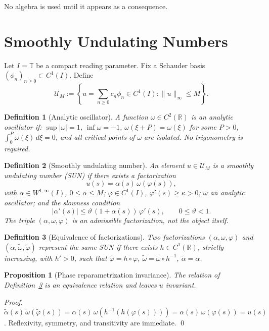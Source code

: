 \documentclass[11pt,a4paper]{article}
\newtheorem{definition}{Definition}
\newtheorem{proposition}{Proposition}
\newcommand{\R}{\mathbb{R}}
\newcommand{\T}{\mathbb{T}}
\newcommand{\UM}{\mathcal{U}_M}
\begin{document}
No algebra is used until it appears as a consequence.

\section{Smoothly Undulating Numbers}

Let $I = \T$ be a compact reading parameter. Fix a Schauder basis
$(\phi_n)_{n\ge0} \subset C^1(I)$. Define
\[
\UM := \left\{ u = \sum_{n\ge0} c_n \phi_n \in C^1(I) :
  \|u\|_\infty \le M \right\}.
\]

\begin{definition}[Analytic oscillator]
\label{def:oscillator}
A function $\omega \in C^2(\R)$ is an \emph{analytic oscillator} if:
$\sup|\omega| = 1$, $\inf\omega = -1$,
$\omega(\xi + P) = \omega(\xi)$ for some $P > 0$,
$\int_0^P \omega(\xi)\,d\xi = 0$,
and all critical points of $\omega$ are isolated.
No trigonometry is required.
\end{definition}

\begin{definition}[Smoothly undulating number]
\label{def:sun}
An element $u \in \UM$ is a \emph{smoothly undulating number} (SUN)
if there exists a factorization
\[
u(s) = \alpha(s)\,\omega(\varphi(s)),
\]
with $\alpha \in W^{1,\infty}(I)$, $0 \le \alpha \le M$;
$\varphi \in C^1(I)$, $\varphi'(s) \ge \kappa > 0$;
$\omega$ an analytic oscillator; and the slowness condition
\begin{equation}\label{eq:A1}
|\alpha'(s)| \le \vartheta\,(1 + \alpha(s))\,\varphi'(s),
\qquad 0 \le \vartheta < 1.  \tag{A1}
\end{equation}
The triple $(\alpha, \omega, \varphi)$ is an \emph{admissible factorization},
not the object itself.
\end{definition}

\begin{definition}[Equivalence of factorizations]
\label{def:equiv}
Two factorizations $(\alpha,\omega,\varphi)$ and
$(\tilde\alpha,\tilde\omega,\tilde\varphi)$ represent the same SUN if
there exists $h \in C^1(\R)$, strictly increasing, with $h' > 0$,
such that $\tilde\varphi = h \circ \varphi$,
$\tilde\omega = \omega \circ h^{-1}$, $\tilde\alpha = \alpha$.
\end{definition}

\begin{proposition}[Phase reparametrization invariance]
\label{prop:invariance}
The relation of Definition~\ref{def:equiv} is an equivalence relation
and leaves $u$ invariant.
\end{proposition}
\begin{proof}
$\tilde\alpha(s)\,\tilde\omega(\tilde\varphi(s))
= \alpha(s)\,\omega(h^{-1}(h(\varphi(s))))
= \alpha(s)\,\omega(\varphi(s))
= u(s)$.
Reflexivity, symmetry, and transitivity are immediate. \qed
\end{proof}
\end{document}
